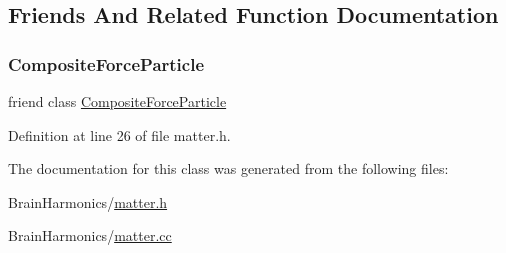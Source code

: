 \subsection{Friends And Related Function Documentation}
\mbox{\label{class_matter_a9bc6eb2a4c20ce83728a7c9a31b91f19}} 
\subsubsection{\texorpdfstring{Composite\+Force\+Particle}{CompositeForceParticle}}
{\footnotesize\ttfamily friend class \mbox{\hyperlink{class_composite_force_particle}{Composite\+Force\+Particle}}\hspace{0.3cm}{\ttfamily [friend]}}



Definition at line 26 of file matter.\+h.



The documentation for this class was generated from the following files\+:\begin{DoxyCompactItemize}
\item 
Brain\+Harmonics/\mbox{\hyperlink{matter_8h}{matter.\+h}}\item 
Brain\+Harmonics/\mbox{\hyperlink{matter_8cc}{matter.\+cc}}\end{DoxyCompactItemize}
